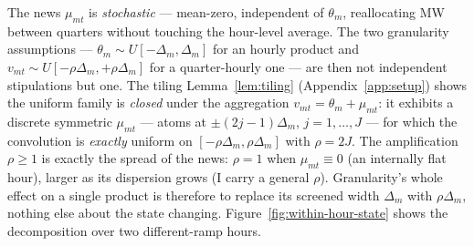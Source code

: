 \documentclass[11pt,a4paper]{article}
\theoremstyle{definition}
\theoremstyle{remark}
\theoremstyle{plain}
\begin{document}
The news $\mu_{mt}$ is \emph{stochastic} --- mean-zero, independent of $\theta_m$, reallocating MW between quarters without touching the hour-level average. The two granularity assumptions --- $\theta_m \sim U[-\Delta_m, \Delta_m]$ for an hourly product and $v_{mt} \sim U[-\rho\Delta_m, +\rho\Delta_m]$ for a quarter-hourly one --- are then not independent stipulations but one. The tiling Lemma~\ref{lem:tiling} (Appendix~\ref{app:setup}) shows the uniform family is \emph{closed} under the aggregation $v_{mt} = \theta_m + \mu_{mt}$: it exhibits a discrete symmetric $\mu_{mt}$ --- atoms at $\pm(2j-1)\Delta_m$, $j = 1,\dots,J$ --- for which the convolution is \emph{exactly} uniform on $[-\rho\Delta_m, \rho\Delta_m]$ with $\rho = 2J$. The amplification $\rho \ge 1$ is exactly the spread of the news: $\rho = 1$ when $\mu_{mt} \equiv 0$ (an internally flat hour), larger as its dispersion grows (I carry a general $\rho$). Granularity's whole effect on a single product is therefore to replace its screened width $\Delta_m$ with $\rho\Delta_m$, nothing else about the state changing. Figure~\ref{fig:within-hour-state} shows the decomposition over two different-ramp hours.
\end{document}
